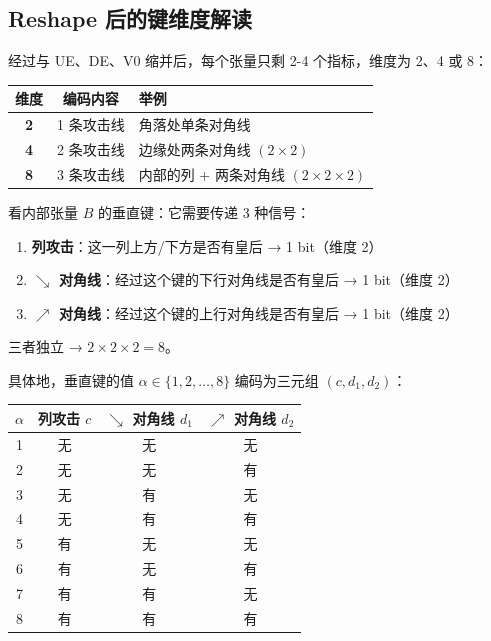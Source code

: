 \documentclass[12pt,a4paper]{article}
\begin{document}
\subsection{Reshape 后的键维度解读}

经过与 UE、DE、V0 缩并后，每个张量只剩 2-4 个指标，维度为 2、4 或 8：

\begin{keybox}[键维度的物理含义]
\begin{center}
\begin{tabular}{ccl}
\toprule
\textbf{维度} & \textbf{编码内容} & \textbf{举例} \\
\midrule
\textbf{2} & 1 条攻击线 & 角落处单条对角线 \\
\textbf{4} & 2 条攻击线 & 边缘处两条对角线 $(2\times 2)$ \\
\textbf{8} & 3 条攻击线 & 内部的列 + 两条对角线 $(2\times 2\times 2)$ \\
\bottomrule
\end{tabular}
\end{center}
\end{keybox}

\begin{exbox}[为什么内部垂直键维度是 8]
看内部张量 $B$ 的垂直键：它需要传递 3 种信号：
\begin{enumerate}
  \item \textbf{列攻击}：这一列上方/下方是否有皇后 → 1 bit（维度 2）
  \item \textbf{$\searrow$ 对角线}：经过这个键的下行对角线是否有皇后 → 1 bit（维度 2）
  \item \textbf{$\nearrow$ 对角线}：经过这个键的上行对角线是否有皇后 → 1 bit（维度 2）
\end{enumerate}
三者独立 → $2 \times 2 \times 2 = 8$。

具体地，垂直键的值 $\alpha \in \{1,2,\ldots,8\}$ 编码为三元组 $(c, d_1, d_2)$：
\begin{center}
\begin{tabular}{cccc}
\toprule
$\alpha$ & 列攻击 $c$ & $\searrow$ 对角线 $d_1$ & $\nearrow$ 对角线 $d_2$ \\
\midrule
1 & 无 & 无 & 无 \\
2 & 无 & 无 & 有 \\
3 & 无 & 有 & 无 \\
4 & 无 & 有 & 有 \\
5 & 有 & 无 & 无 \\
6 & 有 & 无 & 有 \\
7 & 有 & 有 & 无 \\
8 & 有 & 有 & 有 \\
\bottomrule
\end{tabular}
\end{center}
\end{exbox}
\end{document}
